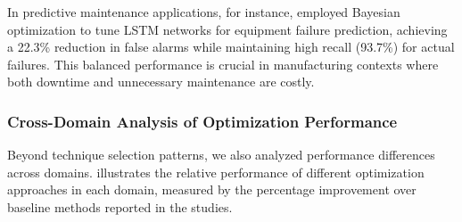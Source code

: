 \documentclass[acmsmall]{acmart}
\begin{document}
In predictive maintenance applications, for instance, \citet{Thoppil2021} employed Bayesian optimization to tune LSTM networks for equipment failure prediction, achieving a 22.3\% reduction in false alarms while maintaining high recall (93.7\%) for actual failures. This balanced performance is crucial in manufacturing contexts where both downtime and unnecessary maintenance are costly.

\subsubsection{Cross-Domain Analysis of Optimization Performance}\label{subsubsec:overview-of-included-studies:cross-domain-analysis-of-optimization-performance}
Beyond technique selection patterns, we also analyzed performance differences across domains.  illustrates the relative performance of different optimization approaches in each domain, measured by the percentage improvement over baseline methods reported in the studies.
\end{document}
